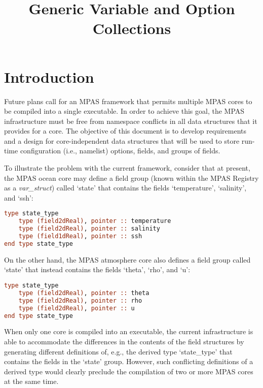 \documentclass[11pt]{report}
\begin{document}
\title{Generic Variable and Option Collections}
\author{}

\maketitle
\tableofcontents


%
%
\chapter{Introduction}

Future plans call for an MPAS framework that permits multiple MPAS cores to be compiled into a single executable. In order to achieve this goal,
the MPAS infrastructure must be free from namespace conflicts in all data structures that it provides for a core. The objective of this document is to develop 
requirements and a design for core-independent data structures that will be used to store run-time configuration (i.e., namelist) options, fields, and groups of fields. 

To illustrate the problem with the current framework, consider that at present, the MPAS ocean core may define a field group (known within the MPAS Registry as a {\em var\_struct}) called `state' that contains the fields `temperature', `salinity', and `ssh':


\begin{lstlisting}[language=fortran,escapechar=@,frame=single]
type state_type
	type (field2dReal), pointer :: temperature
	type (field2dReal), pointer :: salinity
	type (field1dReal), pointer :: ssh
end type state_type
\end{lstlisting}

\noindent On the other hand, the MPAS atmosphere core also defines a field group called `state' that instead contains the fields `theta', `rho', and `u':

\begin{lstlisting}[language=fortran,escapechar=@,frame=single]
type state_type
	type (field2dReal), pointer :: theta
	type (field2dReal), pointer :: rho
	type (field2dReal), pointer :: u
end type state_type
\end{lstlisting}

\noindent When only one core is compiled into an executable, the current infrastructure is able to accommodate the differences in the contents of the field structures by generating different definitions of, e.g., the derived type `state\_type' that contains the fields in the `state' group. However, such conflicting definitions of a derived type would clearly preclude the compilation of two or more MPAS cores at the same time. 
\end{document}
